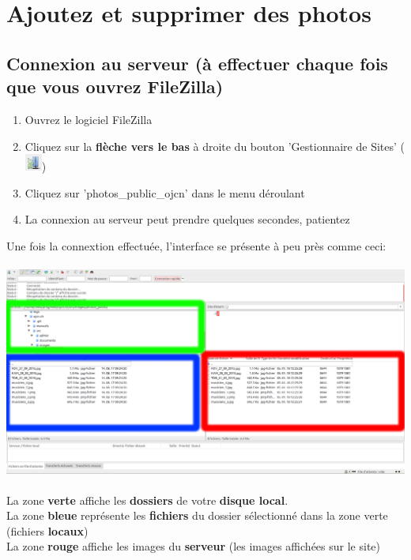 \documentclass[10pt,a4paper]{article}
\begin{document}
\section{Ajoutez et supprimer des photos}
\subsection{Connexion au serveur (à effectuer chaque fois que vous ouvrez FileZilla)}
\begin{enumerate}
\item Ouvrez le logiciel FileZilla
\item Cliquez sur la \textbf{flèche vers le bas} à droite du bouton 'Gestionnaire de Sites' (\includegraphics[scale=1]{images/gestionnaire_de_sites.png})
\item Cliquez sur 'photos\_public\_ojcn' dans le menu déroulant
\item La connexion au serveur peut prendre quelques secondes, patientez
\end{enumerate}
\newpage

Une fois la connextion effectuée, l'interface se présente à peu près comme ceci: \\ 
\\
\includegraphics[scale=.2]{images/connected_modif.png} \\
\\
La zone \textbf{verte} affiche les \textbf{dossiers} de votre \textbf{disque local}.\\
La zone \textbf{bleue} représente les \textbf{fichiers} du dossier sélectionné dans la zone verte (fichiers \textbf{locaux}) \\
La zone \textbf{rouge} affiche les images du \textbf{serveur} (les images affichées sur le site) \\
\end{document}
